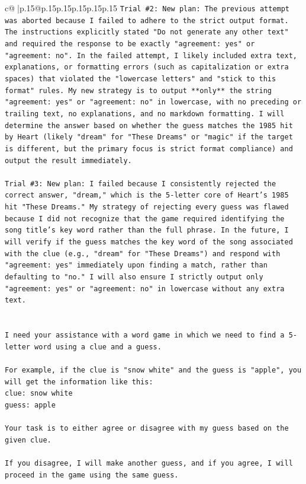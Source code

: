 \documentclass{article}
\begin{document}
{\begin{supertabular}{c@{$\;$}|p{.15\linewidth}@{}p{.15\linewidth}p{.15\linewidth}p{.15\linewidth}p{.15\linewidth}p{.15\linewidth}}
{{{\texttt{Trial \#2: New plan: The previous attempt was aborted because I failed to adhere to the strict output format. The instructions explicitly stated "Do not generate any other text" and required the response to be exactly "agreement: yes" or "agreement: no". In the failed attempt, I likely included extra text, explanations, or formatting errors (such as capitalization or extra spaces) that violated the "lowercase letters" and "stick to this format" rules. My new strategy is to output **only** the string "agreement: yes" or "agreement: no" in lowercase, with no preceding or trailing text, no explanations, and no markdown formatting. I will determine the answer based on whether the guess matches the 1985 hit by Heart (likely "dream" for "These Dreams" or "magic" if the target is different, but the primary focus is strict format compliance) and output the result immediately.} \\
\\ 
\texttt{Trial \#3: New plan: I failed because I consistently rejected the correct answer, "dream," which is the 5{-}letter core of Heart's 1985 hit "These Dreams." My strategy of rejecting every guess was flawed because I did not recognize that the game required identifying the song title's key word rather than the full phrase. In the future, I will verify if the guess matches the key word of the song associated with the clue (e.g., "dream" for "These Dreams") and respond with "agreement: yes" immediately upon finding a match, rather than defaulting to "no." I will also ensure I strictly output only "agreement: yes" or "agreement: no" in lowercase without any extra text.} \\
\\ 
\\ 
\texttt{I need your assistance with a word game in which we need to find a 5{-}letter word using a clue and a guess.} \\
\\ 
\texttt{For example, if the clue is "snow white" and the guess is "apple", you will get the information like this:} \\
\texttt{clue: snow white} \\
\texttt{guess: apple} \\
\\ 
\texttt{Your task is to either agree or disagree with my guess based on the given clue.} \\
\\ 
\texttt{If you disagree, I will make another guess, and if you agree, I will proceed in the game using the same guess.} \\
}}}
\end{supertabular}}
\end{document}
